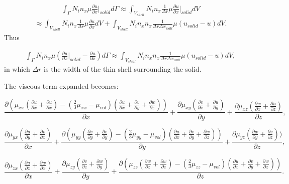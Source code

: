 \begin{eqnarray}
\int_\Gamma  N_i n_x \mu \frac{\partial u}{\partial x} \vert_{solid} d\Gamma
\approx
\int_{V_{shell}}  N_i n_x \frac{1}{\Delta r} \mu \frac{\partial u}{\partial x} \vert_{solid}  dV
\label{visc-stress-original-practical-a}
\end{eqnarray}
\begin{eqnarray}
\approx
\int_{V_{shell}}  N_i n_x \frac{1}{\Delta r}\mu \frac{\partial u}{\partial x}  dV
+
\int_{V_{shell}}  N_i n_x n_x \frac{1}{\Delta r \Delta x_{wall}}\mu (u_{solid} -u)  dV.
\label{visc-stress-original-practical}
\end{eqnarray}
Thus

\begin{eqnarray}
\int_\Gamma N_i n_x \mu ( \frac{\partial u}{\partial x}\vert_{solid} - \frac{\partial u}{\partial x} ) d\Gamma
\approx
\int_{V_{shell}}  N_i n_x n_x \frac{1}{\Delta r \Delta x_{wall} }\mu (u_{solid} -u)  dV,
\end{eqnarray}
in which $\Delta r$ is the width of the thin shell surrounding the solid.


The viscous term expanded becomes:

\begin{equation}
\frac{\partial ( \mu_{xx}
(
\frac{\partial u}{\partial x}+\frac{\partial u}{\partial x})
-(\frac{2}{3}\mu_{xx}-\mu_{vol})(\frac{\partial u}{\partial x}+\frac{\partial v}{\partial y}+\frac{\partial w}{\partial z})
)}
{\partial x}
+
\frac{\partial \mu_{xy}
(
\frac{\partial v}{\partial x}+\frac{\partial u}{\partial y})
}
{\partial y}
+
\frac{\partial \mu_{xz}
(
\frac{\partial w}{\partial x}+\frac{\partial u}{\partial z})
}
{\partial z},
\label{visc-stress-u-2}
\end{equation}



\begin{equation}
\frac{\partial \mu_{yx}
(
\frac{\partial u}{\partial y}+\frac{\partial v}{\partial x}
)}
{\partial x}
+
\frac{\partial (\mu_{yy}
(
\frac{\partial v}{\partial y}+\frac{\partial v}{\partial y})
-(\frac{2}{3}\mu_{yy}-\mu_{vol})(\frac{\partial u}{\partial x}+\frac{\partial v}{\partial y}+\frac{\partial w}{\partial z})
)}
{\partial y}
+
\frac{\partial \mu_{yz}
(
\frac{\partial w}{\partial y}+\frac{\partial v}{\partial z})
)}
{\partial z},
\label{visc-stress-v-2}
\end{equation}



\begin{equation}
\frac{\partial \mu_{zx}
(
\frac{\partial u}{\partial z}+\frac{\partial w}{\partial x})
}
{\partial x}
+
\frac{\partial \mu_{zy}
(
\frac{\partial v}{\partial z}+\frac{\partial w}{\partial y})
}
{\partial y}
+
\frac{\partial ( \mu_{zz}
(
\frac{\partial w}{\partial z}+\frac{\partial w}{\partial z})
-(\frac{2}{3}\mu_{zz}-\mu_{vol})(\frac{\partial u}{\partial x}+\frac{\partial v}{\partial y}+\frac{\partial w}{\partial z})
)}
{\partial z}.
\label{visc-stress-w-2}
\end{equation}


